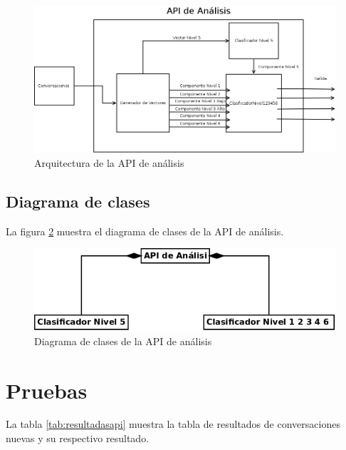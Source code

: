 \begin{figure}[h]
\begin{center}
\includegraphics[scale=.3]{images/api}
\caption{Arquitectura de la API de an\'alisis}
\label{fig:arquitecturap5}
\end{center}
\end{figure}


\subsection{Diagrama de clases}


La figura \ref{fig:dclasesp5} muestra el diagrama de clases de la API de an\'alisis.
\begin{figure}[h]
\begin{center}
\includegraphics[scale=.5]{images/clasesnivel5}
\caption{Diagrama de clases de la API de an\'alisis}
\label{fig:dclasesp5}
\end{center}
\end{figure}

\section{Pruebas}


La tabla  \ref{tab:resultadasapi} muestra la tabla de resultados de conversaciones nuevas y su respectivo resultado.

